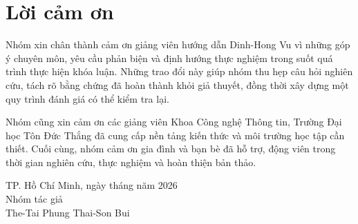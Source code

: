 \chapter*{Lời cảm ơn}

Nhóm xin chân thành cảm ơn giảng viên hướng dẫn Dinh-Hong Vu vì những góp ý
chuyên môn, yêu cầu phản biện và định hướng thực nghiệm trong suốt quá trình
thực hiện khóa luận. Những trao đổi này giúp nhóm thu hẹp câu hỏi nghiên cứu,
tách rõ bằng chứng đã hoàn thành khỏi giả thuyết, đồng thời xây dựng một quy
trình đánh giá có thể kiểm tra lại.

Nhóm cũng xin cảm ơn các giảng viên Khoa Công nghệ Thông tin, Trường Đại học
Tôn Đức Thắng đã cung cấp nền tảng kiến thức và môi trường học tập cần thiết.
Cuối cùng, nhóm cảm ơn gia đình và bạn bè đã hỗ trợ, động viên trong thời gian
nghiên cứu, thực nghiệm và hoàn thiện bản thảo.

\vfill
\begin{flushright}
TP. Hồ Chí Minh, ngày \hspace{0.6cm} tháng \hspace{0.6cm} năm 2026\\[0.4cm]
Nhóm tác giả\\[1.5cm]
The-Tai Phung \hspace{1.5cm} Thai-Son Bui
\end{flushright}
\clearpage
